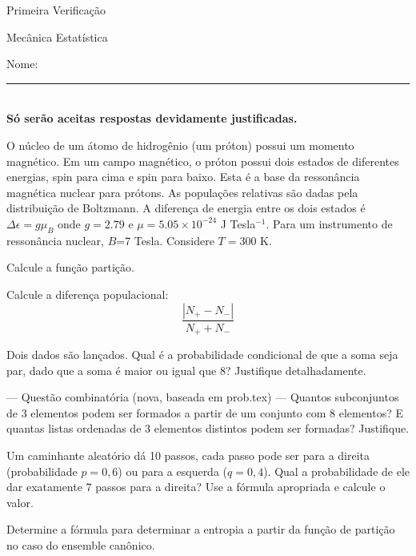\documentclass[fleqn,a4paper]{exam}
\theoremstyle{break} \newtheorem{exemplo}{Exemplo}
\theoremstyle{break} \newtheorem{exercicio}{Exercício}
\begin{document}
\begin{center}
{\large Primeira Verificação}

{\large Mecânica Estatística}
\end{center}
\vspace{0.5cm} Nome:\rule{14cm}{0.01cm} \\

\vspace{1 cm}
{\bf Só serão aceitas respostas devidamente justificadas.}
\vspace{1 cm}

\begin{questions}

\question[3.0] O núcleo de um átomo de hidrogênio (um próton) possui um momento magnético.
Em um campo magnético, o próton possui dois estados de diferentes energias, spin para cima e spin para baixo. Esta é a base da ressonância magnética nuclear para prótons. As populações relativas são dadas pela distribuição de Boltzmann. A diferença de energia entre os dois estados é $\Delta\epsilon =g\mu_B$ onde $g=2.79$ e $\mu=5.05\times 10^{-24}$ J Tesla$^{-1}$. Para um instrumento de ressonância nuclear, $B$=7 Tesla. Considere $T=300$ K.
\begin{parts}
  \item Calcule a função partição.
  \item Calcule a diferença populacional: $$\frac{|N_+-N_-|}{N_++N_-}$$
\end{parts}

\question[2.0] Dois dados são lançados. Qual é a probabilidade condicional de que a soma seja par, dado que a soma é maior ou igual que 8? Justifique detalhadamente.


 --- Questão combinatória (nova, baseada em prob.tex) ---
\question[2.0] Quantos subconjuntos de 3 elementos podem ser formados a partir de um conjunto com 8 elementos? E quantas listas ordenadas de 3 elementos distintos podem ser formadas? Justifique.

\question[2.0] Um caminhante aleatório dá 10 passos, cada passo pode ser para a direita (probabilidade $p=0,6$) ou para a esquerda ($q=0,4$). Qual a probabilidade de ele dar exatamente 7 passos para a direita? Use a fórmula apropriada e calcule o valor.

\question[1.0] Determine a fórmula para determinar a entropia a partir da função de partição no caso do ensemble canônico. 
\end{questions}
\end{document}
